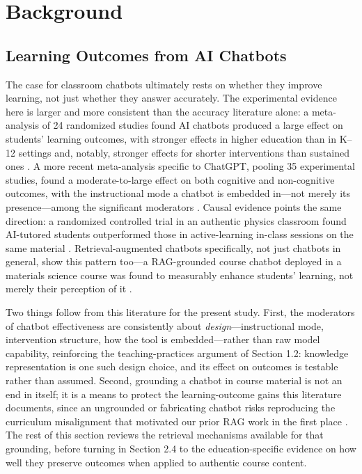 \documentclass[letterpaper]{article} %
\begin{document}
\section{Background}

\subsection{Learning Outcomes from AI Chatbots}

The case for classroom chatbots ultimately rests on whether they improve learning, not just whether they answer accurately. The experimental evidence here is larger and more consistent than the accuracy literature alone: a meta-analysis of 24 randomized studies found AI chatbots produced a large effect on students' learning outcomes, with stronger effects in higher education than in K--12 settings and, notably, stronger effects for shorter interventions than sustained ones \citep{wu2024chatbots}. A more recent meta-analysis specific to ChatGPT, pooling 35 experimental studies, found a moderate-to-large effect on both cognitive and non-cognitive outcomes, with the instructional mode a chatbot is embedded in---not merely its presence---among the significant moderators \citep{wu2026chatgpt}. Causal evidence points the same direction: a randomized controlled trial in an authentic physics classroom found AI-tutored students outperformed those in active-learning in-class sessions on the same material \citep{kestin2025tutoring}. Retrieval-augmented chatbots specifically, not just chatbots in general, show this pattern too---a RAG-grounded course chatbot deployed in a materials science course was found to measurably enhance students' learning, not merely their perception of it \citep{thway2025harnessing}.

Two things follow from this literature for the present study. First, the moderators of chatbot effectiveness are consistently about \emph{design}---instructional mode, intervention structure, how the tool is embedded---rather than raw model capability, reinforcing the teaching-practices argument of Section 1.2: knowledge representation is one such design choice, and its effect on outcomes is testable rather than assumed. Second, grounding a chatbot in course material is not an end in itself; it is a means to protect the learning-outcome gains this literature documents, since an ungrounded or fabricating chatbot risks reproducing the curriculum misalignment that motivated our prior RAG work in the first place \citep{wright2026multimodal}. The rest of this section reviews the retrieval mechanisms available for that grounding, before turning in Section 2.4 to the education-specific evidence on how well they preserve outcomes when applied to authentic course content.
\end{document}
